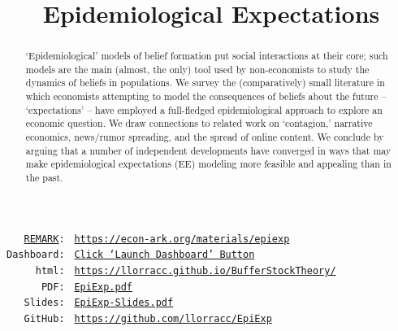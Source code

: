{    \title{Epidemiological Expectations}
    \renewcommand{\forcedate}{February 5, 2022}
    \maketitle
    \hypertarget{abstract}{}
    \begin{abstract}
      `Epidemiological' models of belief formation put social interactions at their core; such models are the main (almost, the only) tool used by non-economists to study the dynamics of beliefs in populations.  We survey the (comparatively) small literature in which economists attempting to model the consequences of beliefs about the future -- `expectations' -- have employed a full-fledged epidemiological approach to explore an economic question.  We draw connections to related work on `contagion,' narrative economics, news/rumor spreading, and the spread of online content. We conclude by arguing that a number of independent developments have converged in ways that may make epidemiological expectations (EE) modeling more feasible and appealing than in the past.
    \end{abstract}

    \vspace{1.0in}
    \newcommand{\owner}{llorracc}
    \newcommand{\REMARK}{\href{https://github.com/econ-ark/REMARK}{REMARK}}
      \parbox{0.9\textwidth}{
        \begin{center}
          \begin{tabbing}
            \texttt{~~~\REMARK:~} \= \= \texttt{\url{https://econ-ark.org/materials/epiexp}} \\ 
            \texttt{Dashboard:~} \> \> \texttt{\href{https://econ-ark.org/materials/epiexp?launch}{Click `Launch Dashboard' Button}} \\
            \texttt{~~~~~html:~} \> \> \texttt{\href{https://\owner.github.io/EpiExp}{https://\owner.github.io/BufferStockTheory/}} \\ %
            \texttt{~~~~~~PDF:~} \> \> \texttt{\href{https://github.com/\owner/EpiExp/blob/master/EpiExp.pdf}{EpiExp.pdf}} \\ 
            \texttt{~~~Slides:~} \> \> \texttt{\href{https://github.com/\owner/EpiExp/blob/master/EpiExp-Slides.pdf}{EpiExp-Slides.pdf}} \\
            \texttt{~~~GitHub:~} \> \> \texttt{\href{https://github.com/\owner/EpiExp}{https://github.com/\owner/EpiExp}} \\
          \end{tabbing}
        \end{center}
      }

}
